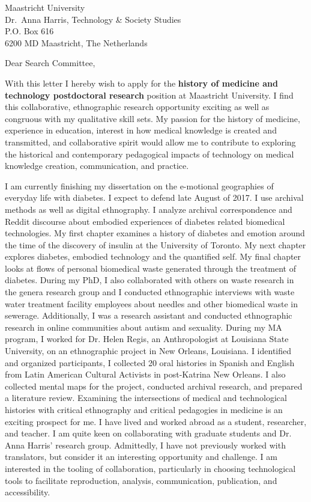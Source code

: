 \documentclass[10pt,a4paper]{letter}
\begin{document}
 
\begin{letter}{Maastricht University \\ Dr.~Anna Harris, Technology \& Society Studies \\ P.O. Box 616 \\ 6200 MD Maastricht, The Netherlands} 
\opening{Dear Search Committee,} 
With this letter I hereby wish to apply for the \textbf{history of medicine and technology postdoctoral research} position at Maastricht University. I find this collaborative, ethnographic research opportunity exciting as well as congruous with my qualitative skill sets. My passion for the history of medicine, experience in education, interest in how medical knowledge is created and transmitted, and  collaborative spirit would allow me to contribute to exploring the historical and contemporary pedagogical impacts of technology on medical knowledge creation, communication, and practice.

I am currently finishing my dissertation on the e-motional geographies
of everyday life with diabetes. I expect to defend late August of 2017.
I use archival methods as well as digital ethnography. I analyze
archival correspondence and Reddit discourse about embodied experiences
of diabetes related biomedical technologies. My first chapter examines a history of diabetes and emotion around the time of the discovery of insulin at the University of Toronto. My next chapter explores diabetes, embodied technology and the quantified self. My final chapter looks at flows of personal biomedical waste generated through the treatment of diabetes.  
During my PhD, I also collaborated with others on waste research in the genera research group and I conducted ethnographic interviews with waste water treatment facility employees
about needles and other biomedical waste in sewerage. Additionally, I was a research assistant and conducted ethnographic research in online communities about autism and sexuality.
During my MA program, I worked for Dr. Helen Regis, an Anthropologist at
Louisiana State University, on an ethnographic project in New Orleans,
Louisiana. I identified and organized participants, I collected 20 oral
histories in Spanish and English from Latin American Cultural Activists
in post-Katrina New Orleans. I also collected mental maps for the
project, conducted archival research, and prepared a literature review.
Examining the intersections of medical and technological histories with
critical ethnography and critical pedagogies in medicine is an exciting
prospect for me. I have lived and worked abroad as a student,
researcher, and teacher. I am quite keen on collaborating with graduate
students and Dr. Anna Harris' research group. Admittedly, I have not previously worked
with translators, but consider it an interesting opportunity and challenge.
I am interested in the tooling of collaboration, particularly in
choosing technological tools to facilitate reproduction, analysis,
communication, publication, and accessibility.



\end{letter}
\end{document}
